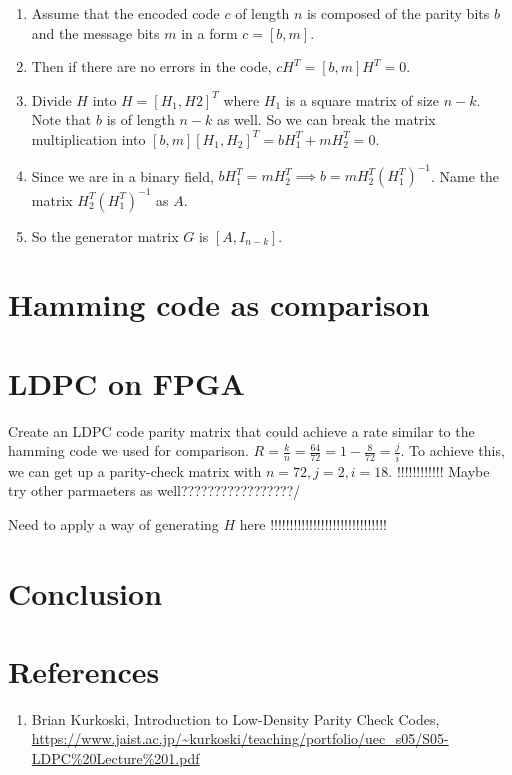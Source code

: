 \documentclass[letterpaper,12pt,oneside]{article}
\begin{document}
\begin{enumerate}
    \item Assume that the encoded code $c$ of length $n$ is composed of the parity bits $b$ and the message bits $m$ in a form $c = [b, m]$.
    \item Then if there are no errors in the code, $cH^T = [b, m]H^T = 0$.
    \item Divide $H$ into $H = [H_1, H2]^T$ where $H_1$ is a square matrix of size $n-k$. Note that $b$ is of length $n-k$ as well. So we can break the matrix multiplication into $[b, m][H_1, H_2]^T = bH_1^T + mH_2^T = 0$.
    \item Since we are in a binary field, $bH_1^T = mH_2^T \implies b = mH_2^T(H_1^T)^{-1}$. Name the matrix $H_2^T(H_1^T)^{-1}$ as $A$.
    \item So the generator matrix $G$ is $[A, I_{n-k}]$.
\end{enumerate}

\section{Hamming code as comparison}
\section{LDPC on FPGA}
Create an LDPC code parity matrix that could achieve a rate similar to the hamming code we used for comparison. $R=\frac{k}{n}=\frac{64}{72}=1-\frac{8}{72} = \frac{j}{i}$. To achieve this, we can get up a parity-check matrix with $n=72, j=2, i=18$.  !!!!!!!!!!!! Maybe try other parmaeters as well?????????????????/

Need to apply a way of generating $H$ here !!!!!!!!!!!!!!!!!!!!!!!!!!!!!!
\section{Conclusion}
\section{References}
\begin{enumerate}
    \item \label{[1]} Brian Kurkoski, Introduction to Low-Density Parity Check Codes, \url{https://www.jaist.ac.jp/~kurkoski/teaching/portfolio/uec_s05/S05-LDPC%20Lecture%201.pdf}
\end{enumerate}
\end{document}
